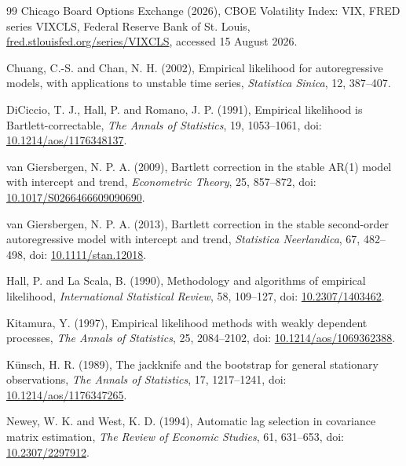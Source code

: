 \documentclass[12pt]{article}
\theoremstyle{remark}
\begin{document}
\begin{thebibliography}{99}
Chicago Board Options Exchange (2026), CBOE Volatility Index: VIX, FRED series VIXCLS, Federal Reserve Bank of St. Louis, \href{https://fred.stlouisfed.org/series/VIXCLS}{fred.stlouisfed.org/series/VIXCLS}, accessed 15 August 2026.

Chuang, C.-S. and Chan, N. H. (2002), Empirical likelihood for autoregressive models, with applications to unstable time series, \emph{Statistica Sinica}, 12, 387--407.

DiCiccio, T. J., Hall, P. and Romano, J. P. (1991), Empirical likelihood is Bartlett-correctable, \emph{The Annals of Statistics}, 19, 1053--1061, doi: \href{https://doi.org/10.1214/aos/1176348137}{10.1214/aos/1176348137}.


van Giersbergen, N. P. A. (2009), Bartlett correction in the stable AR(1) model with intercept and trend, \emph{Econometric Theory}, 25, 857--872, doi: \href{https://doi.org/10.1017/S0266466609090690}{10.1017/S0266466609090690}.

van Giersbergen, N. P. A. (2013), Bartlett correction in the stable second-order autoregressive model with intercept and trend, \emph{Statistica Neerlandica}, 67, 482--498, doi: \href{https://doi.org/10.1111/stan.12018}{10.1111/stan.12018}.

Hall, P. and La Scala, B. (1990), Methodology and algorithms of empirical likelihood, \emph{International Statistical Review}, 58, 109--127, doi: \href{https://doi.org/10.2307/1403462}{10.2307/1403462}.

Kitamura, Y. (1997), Empirical likelihood methods with weakly dependent processes, \emph{The Annals of Statistics}, 25, 2084--2102, doi: \href{https://doi.org/10.1214/aos/1069362388}{10.1214/aos/1069362388}.

K\"unsch, H. R. (1989), The jackknife and the bootstrap for general stationary observations, \emph{The Annals of Statistics}, 17, 1217--1241, doi: \href{https://doi.org/10.1214/aos/1176347265}{10.1214/aos/1176347265}.

Newey, W. K. and West, K. D. (1994), Automatic lag selection in covariance matrix estimation, \emph{The Review of Economic Studies}, 61, 631--653, doi: \href{https://doi.org/10.2307/2297912}{10.2307/2297912}.


\end{thebibliography}
\end{document}
